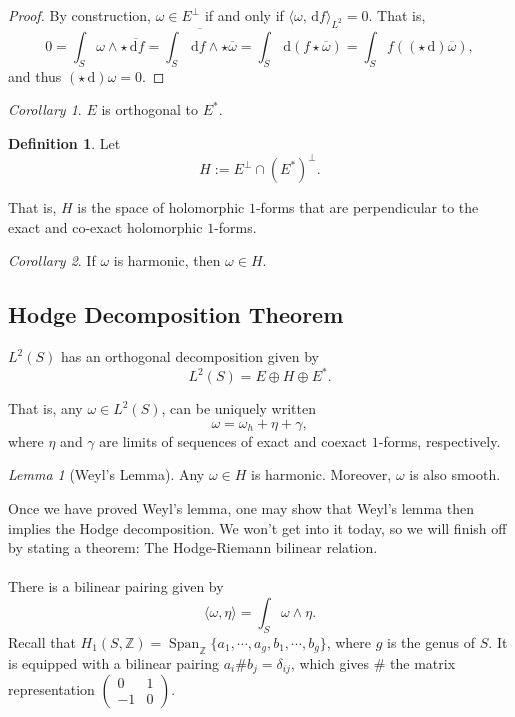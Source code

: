 \documentclass[a4paper]{report}
\theoremstyle{definition}
\newtheorem{definition}{Definition}
\theoremstyle{remark}
\theoremstyle{proposition}
\theoremstyle{conjecture}
\theoremstyle{lemma}
\newtheorem{lemma}{Lemma}
\theoremstyle{corollary}
\newtheorem{corollary}{Corollary}
\theoremstyle{exercise}
\theoremstyle{example}
\newcommand{\diff}{\,\mathrm{d}}
\newcommand{\on}{\operatorname}
\begin{document}
\begin{proof}
    By construction, $\omega \in E^\perp$ if and only if 
    $\langle \omega,\diff f\rangle_{L^2} = 0$. That is,
    $$0=\int_S \omega \wedge \star \overline{\diff f} = \overline{\int_S \diff f \wedge \star \overline{\omega}} = \int_S \diff (f\star \overline{\omega})= \int_S f((\star\diff) \overline{\omega}),$$
    and thus $(\star \diff)\omega = 0$.
\end{proof}

\begin{corollary}
    $E$ is orthogonal to $E^\ast$.
\end{corollary}

\begin{definition}
    Let $$H := E^\perp \cap (E^\ast)^\perp.$$
\end{definition}

That is, $H$ is the space of holomorphic $1$-forms that are perpendicular
to the exact and co-exact holomorphic $1$-forms.

\begin{corollary}
    If $\omega$ is harmonic, then $\omega \in H$.
\end{corollary}

\subsection{Hodge Decomposition Theorem}

\begin{theorem}
   $L^2(S)$ has an orthogonal decomposition given by 
   $$L^2(S) = E \oplus H \oplus E^\ast.$$
\end{theorem}

That is, any $\omega\in L^2(S)$, can be uniquely written 
$$\omega = \omega_h + \eta + \gamma,$$
where $\eta$ and $\gamma$ are limits of sequences of exact and coexact 
$1$-forms, respectively.

\begin{lemma}[Weyl's Lemma]
    Any $\omega \in H$ is harmonic. Moreover, $\omega$ is also smooth.
\end{lemma}

Once we have proved Weyl's lemma, one may show that Weyl's lemma then 
implies the Hodge decomposition. We won't get into it today, so we 
will finish off by stating a theorem: The Hodge-Riemann bilinear 
relation.\\\\
There is a bilinear pairing given by 
$$\langle \omega, \eta\rangle = \int_S \omega \wedge \eta.$$
Recall that $H_1(S,\mathbb{Z}) = \on{Span}_{\mathbb{Z}} \lbrace a_1,\cdots,a_g,b_1,\cdots,b_g\rbrace$, where $g$ is the genus of $S$. It is equipped with a 
bilinear pairing $a_i \# b_j = \delta_{ij}$, which gives $\#$ the 
matrix representation $\begin{pmatrix}
    0&1\\
    -1&0
\end{pmatrix}$.
\end{document}
